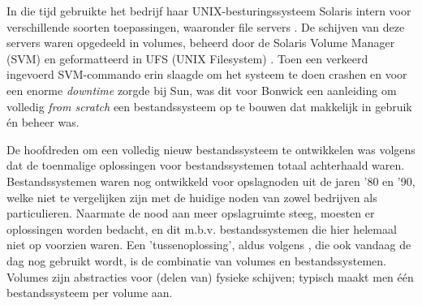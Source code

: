 In die tijd gebruikte het bedrijf haar UNIX-besturingssysteem Solaris intern voor verschillende soorten toepassingen, waaronder file servers \autocite{Bonwick2015}. De schijven van deze servers waren opgedeeld in volumes, beheerd door de Solaris Volume Manager (SVM) en geformatteerd in UFS (UNIX Filesystem) \autocite{Bonwick2015}. Toen een verkeerd ingevoerd SVM-commando erin slaagde om het systeem te doen crashen en voor een enorme \textit{downtime} zorgde bij  Sun, was dit voor Bonwick een aanleiding om volledig \textit{from scratch} een bestandssysteem op te bouwen dat makkelijk in gebruik én beheer was.

De hoofdreden om een volledig nieuw bestandssysteem te ontwikkelen was volgens \textcite{JeffBonwick_lastZFS} dat de toenmalige oplossingen voor bestandssystemen totaal achterhaald waren. Bestandssystemen waren nog ontwikkeld voor opslagnoden uit de jaren '80 en '90, welke niet te vergelijken zijn met de huidige noden van zowel bedrijven als particulieren. Naarmate de nood aan meer opslagruimte steeg, moesten er oplossingen worden bedacht, en dit m.b.v. bestandssystemen die hier helemaal niet op voorzien waren. Een 'tussenoplossing', aldus volgens \textcite{JeffBonwick_lastZFS}, die ook vandaag de dag nog gebruikt wordt, is de combinatie van volumes en bestandssystemen. Volumes zijn abstracties voor (delen van) fysieke schijven; typisch maakt men één bestandssysteem per volume aan. 



